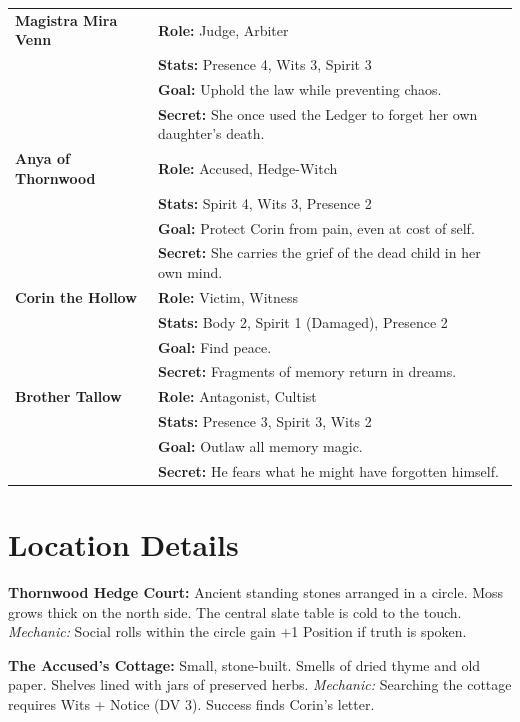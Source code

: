 \documentclass[12pt]{book}
\begin{document}
\begin{longtable}{p{} p{}}
\toprule
\textbf{Magistra Mira Venn} & \textbf{Role:} Judge, Arbiter \\
& \textbf{Stats:} Presence 4, Wits 3, Spirit 3 \\
& \textbf{Goal:} Uphold the law while preventing chaos. \\
& \textbf{Secret:} She once used the Ledger to forget her own daughter's death. \\
\midrule
\textbf{Anya of Thornwood} & \textbf{Role:} Accused, Hedge-Witch \\
& \textbf{Stats:} Spirit 4, Wits 3, Presence 2 \\
& \textbf{Goal:} Protect Corin from pain, even at cost of self. \\
& \textbf{Secret:} She carries the grief of the dead child in her own mind. \\
\midrule
\textbf{Corin the Hollow} & \textbf{Role:} Victim, Witness \\
& \textbf{Stats:} Body 2, Spirit 1 (Damaged), Presence 2 \\
& \textbf{Goal:} Find peace. \\
& \textbf{Secret:} Fragments of memory return in dreams. \\
\midrule
\textbf{Brother Tallow} & \textbf{Role:} Antagonist, Cultist \\
& \textbf{Stats:} Presence 3, Spirit 3, Wits 2 \\
& \textbf{Goal:} Outlaw all memory magic. \\
& \textbf{Secret:} He fears what he might have forgotten himself. \\
\bottomrule
\end{longtable}

\section{Location Details}

\textbf{Thornwood Hedge Court:}
Ancient standing stones arranged in a circle. Moss grows thick on the north side. The central slate table is cold to the touch.
\textit{Mechanic:} Social rolls within the circle gain +1 Position if truth is spoken.

\textbf{The Accused's Cottage:}
Small, stone-built. Smells of dried thyme and old paper. Shelves lined with jars of preserved herbs.
\textit{Mechanic:} Searching the cottage requires Wits + Notice (DV 3). Success finds Corin's letter.
\end{document}
